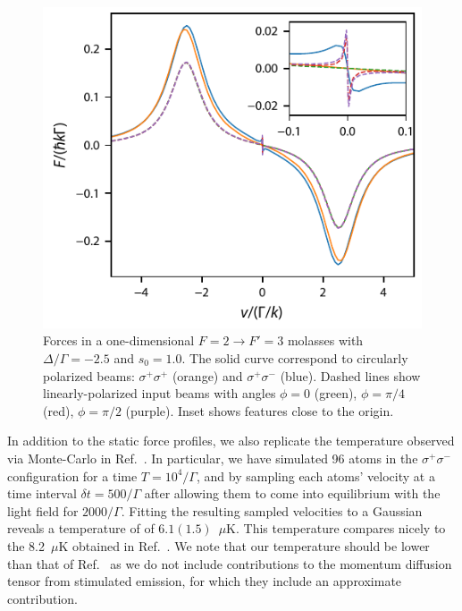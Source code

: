 \documentclass[final,5p,times,twocolumn]{elsarticle}
\begin{document}
\begin{figure}
	\center
	\includegraphics{figs/F2_to_F3_subDoppler_force}
	\caption{\label{fig:sub_doppler_force} Forces in a one-dimensional $F=2\rightarrow F'=3$ molasses with $\Delta/\Gamma=-2.5$ and $s_0=1.0$.  The solid curve correspond to circularly polarized beams: $\sigma^+\sigma^+$ (orange) and $\sigma^+\sigma^-$ (blue).  Dashed lines show linearly-polarized input beams with angles $\phi=0$ (green), $\phi=\pi/4$ (red), $\phi=\pi/2$ (purple). Inset shows features close to the origin.}
\end{figure}


In addition to the static force profiles, we also replicate the temperature observed via Monte-Carlo in Ref.~\cite{Ungar1989}.  In particular, we have simulated 96 atoms in the $\sigma^+\sigma^-$ configuration for a time $T=10^4/\Gamma$, and by sampling each atoms' velocity at a time interval $\delta t=500/\Gamma$ after allowing them to come into equilibrium with the light field for $2000/\Gamma$.  Fitting the resulting sampled velocities to a Gaussian reveals a temperature of  of $6.1(1.5)$~$\mu$K.  This temperature  compares nicely to the 8.2~$\mu$K obtained in Ref.~\cite{Ungar1989}.  We note that our temperature should be lower than that of Ref.~\cite{Ungar1989} as we do not include contributions to the momentum diffusion tensor from stimulated emission, for which they include an approximate contribution.
\end{document}
